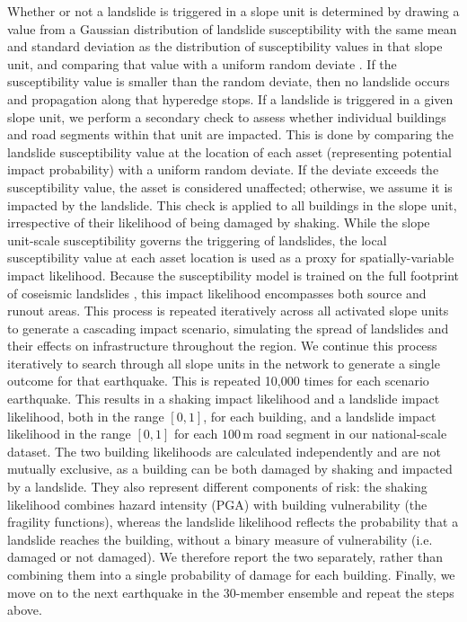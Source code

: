 \documentclass[preprint,12pt,authoryear]{elsarticle}
\begin{document}
Whether or not a landslide is triggered in a slope unit is determined by drawing a value from a Gaussian distribution of landslide susceptibility with the same mean and standard deviation as the distribution of susceptibility values in that slope unit, and comparing that value with a uniform random deviate \citep{Dunant2025}. If the susceptibility value is smaller than the random deviate, then no landslide occurs and propagation along that hyperedge stops. If a landslide is triggered in a given slope unit, we perform a secondary check to assess whether individual buildings and road segments within that unit are impacted. This is done by comparing the landslide susceptibility value at the location of each asset (representing potential impact probability) with a uniform random deviate. If the deviate exceeds the susceptibility value, the asset is considered unaffected; otherwise, we assume it is impacted by the landslide. This check is applied to all buildings in the slope unit, irrespective of their likelihood of being damaged by shaking. While the slope unit-scale susceptibility governs the triggering of landslides, the local susceptibility value at each asset location is used as a proxy for spatially-variable impact likelihood. Because the susceptibility model is trained on the full footprint of coseismic landslides \citep{Kincey2021}, this impact likelihood encompasses both source and runout areas. This process is repeated iteratively across all activated slope units to generate a cascading impact scenario, simulating the spread of landslides and their effects on infrastructure throughout the region. We continue this process iteratively to search through all slope units in the network to generate a single outcome for that earthquake. This is repeated 10,000 times for each scenario earthquake. This results in a shaking impact likelihood and a landslide impact likelihood, both in the range $[0,1]$, for each building, and a landslide impact likelihood in the range $[0,1]$ for each $100\,\text{m}$ road segment in our national-scale dataset. The two building likelihoods are calculated independently and are not mutually exclusive, as a building can be both damaged by shaking and impacted by a landslide. They also represent different components of risk: the shaking likelihood combines hazard intensity (PGA) with building vulnerability (the fragility functions), whereas the landslide likelihood reflects the probability that a landslide reaches the building, without a binary measure of vulnerability (i.e. damaged or not damaged). We therefore report the two separately, rather than combining them into a single probability of damage for each building. Finally, we move on to the next earthquake in the 30-member ensemble and repeat the steps above.
\end{document}
